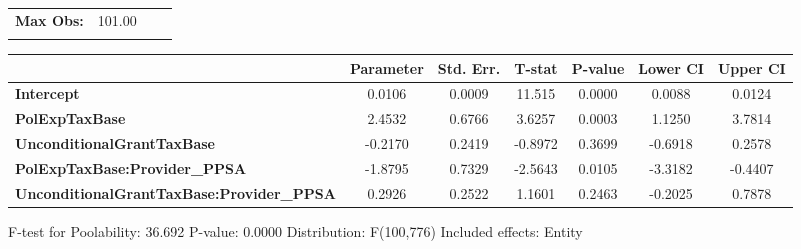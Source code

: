 \begin{center}
\begin{tabular}{lclc}
\textbf{Max Obs:}                                 &       101.00       & \textbf{                     }   &                  \\
\textbf{}                                         &                    & \textbf{                     }   &                  \\
\bottomrule
\end{tabular}
\begin{tabular}{lcccccc}
                                                  & \textbf{Parameter} & \textbf{Std. Err.} & \textbf{T-stat} & \textbf{P-value} & \textbf{Lower CI} & \textbf{Upper CI}  \\
\midrule
\textbf{Intercept}                                &       0.0106       &       0.0009       &      11.515     &      0.0000      &       0.0088      &       0.0124       \\
\textbf{PolExpTaxBase}                            &       2.4532       &       0.6766       &      3.6257     &      0.0003      &       1.1250      &       3.7814       \\
\textbf{UnconditionalGrantTaxBase}                &      -0.2170       &       0.2419       &     -0.8972     &      0.3699      &      -0.6918      &       0.2578       \\
\textbf{PolExpTaxBase:Provider\_PPSA}             &      -1.8795       &       0.7329       &     -2.5643     &      0.0105      &      -3.3182      &      -0.4407       \\
\textbf{UnconditionalGrantTaxBase:Provider\_PPSA} &       0.2926       &       0.2522       &      1.1601     &      0.2463      &      -0.2025      &       0.7878       \\
\bottomrule
\end{tabular}
\end{center}

F-test for Poolability: 36.692 \newline
 P-value: 0.0000 \newline
 Distribution: F(100,776) \newline
  \newline
 Included effects: Entity